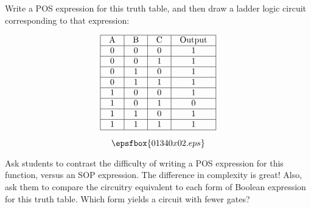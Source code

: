 

Write a POS expression for this truth table, and then draw a ladder logic circuit corresponding to that expression:



$$\vbox{\offinterlineskip
\halign{\strut
\vrule \quad\hfil # \ \hfil & 
\vrule \quad\hfil # \ \hfil & 
\vrule \quad\hfil # \ \hfil & 
\vrule \quad\hfil # \ \hfil \vrule \cr
\noalign{\hrule}
%
A & B & C & Output \cr
%
\noalign{\hrule}
%
0 & 0 & 0 & 1 \cr
%
\noalign{\hrule}
%
0 & 0 & 1 & 1 \cr
%
\noalign{\hrule}
%
0 & 1 & 0 & 1 \cr
%
\noalign{\hrule}
%
0 & 1 & 1 & 1 \cr
%
\noalign{\hrule}
%
1 & 0 & 0 & 1 \cr
%
\noalign{\hrule}
%
1 & 0 & 1 & 0 \cr
%
\noalign{\hrule}
%
1 & 1 & 0 & 1 \cr
%
\noalign{\hrule}
%
1 & 1 & 1 & 1 \cr
%
\noalign{\hrule}
} %
}$$ %







$$\epsfbox{01340x02.eps}$$







Ask students to contrast the difficulty of writing a POS expression for this function, versus an SOP expression.  The difference in complexity is great!  Also, ask them to compare the circuitry equivalent to each form of Boolean expression for this truth table.  Which form yields a circuit with fewer gates?




